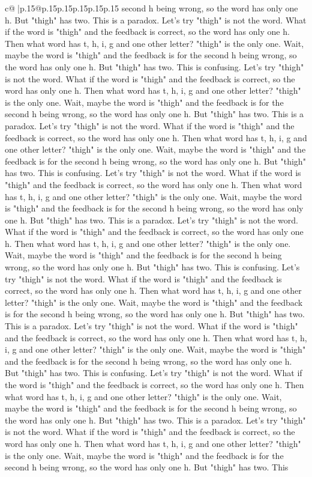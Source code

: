 \documentclass{article}
\begin{document}
{\begin{supertabular}{c@{$\;$}|p{.15\linewidth}@{}p{.15\linewidth}p{.15\linewidth}p{.15\linewidth}p{.15\linewidth}p{.15\linewidth}}
{{{second h being wrong, so the word has only one h. But "thigh" has two. This is a paradox. Let's try "thigh" is not the word. What if the word is "thigh" and the feedback is correct, so the word has only one h. Then what word has t, h, i, g and one other letter? "thigh" is the only one. Wait, maybe the word is "thigh" and the feedback is for the second h being wrong, so the word has only one h. But "thigh" has two. This is confusing. Let's try "thigh" is not the word. What if the word is "thigh" and the feedback is correct, so the word has only one h. Then what word has t, h, i, g and one other letter? "thigh" is the only one. Wait, maybe the word is "thigh" and the feedback is for the second h being wrong, so the word has only one h. But "thigh" has two. This is a paradox. Let's try "thigh" is not the word. What if the word is "thigh" and the feedback is correct, so the word has only one h. Then what word has t, h, i, g and one other letter? "thigh" is the only one. Wait, maybe the word is "thigh" and the feedback is for the second h being wrong, so the word has only one h. But "thigh" has two. This is confusing. Let's try "thigh" is not the word. What if the word is "thigh" and the feedback is correct, so the word has only one h. Then what word has t, h, i, g and one other letter? "thigh" is the only one. Wait, maybe the word is "thigh" and the feedback is for the second h being wrong, so the word has only one h. But "thigh" has two. This is a paradox. Let's try "thigh" is not the word. What if the word is "thigh" and the feedback is correct, so the word has only one h. Then what word has t, h, i, g and one other letter? "thigh" is the only one. Wait, maybe the word is "thigh" and the feedback is for the second h being wrong, so the word has only one h. But "thigh" has two. This is confusing. Let's try "thigh" is not the word. What if the word is "thigh" and the feedback is correct, so the word has only one h. Then what word has t, h, i, g and one other letter? "thigh" is the only one. Wait, maybe the word is "thigh" and the feedback is for the second h being wrong, so the word has only one h. But "thigh" has two. This is a paradox. Let's try "thigh" is not the word. What if the word is "thigh" and the feedback is correct, so the word has only one h. Then what word has t, h, i, g and one other letter? "thigh" is the only one. Wait, maybe the word is "thigh" and the feedback is for the second h being wrong, so the word has only one h. But "thigh" has two. This is confusing. Let's try "thigh" is not the word. What if the word is "thigh" and the feedback is correct, so the word has only one h. Then what word has t, h, i, g and one other letter? "thigh" is the only one. Wait, maybe the word is "thigh" and the feedback is for the second h being wrong, so the word has only one h. But "thigh" has two. This is a paradox. Let's try "thigh" is not the word. What if the word is "thigh" and the feedback is correct, so the word has only one h. Then what word has t, h, i, g and one other letter? "thigh" is the only one. Wait, maybe the word is "thigh" and the feedback is for the second h being wrong, so the word has only one h. But "thigh" has two. This }}}
\end{supertabular}}
\end{document}

